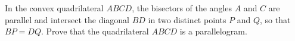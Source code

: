 \problem
In the convex quadrilateral $ABCD$, the bisectors of the angles $A$ and $C$ are parallel and intersect the diagonal $BD$ in two distinct points $P$ and $Q$, so that $BP = DQ$. 
Prove that the quadrilateral $ABCD$ is a parallelogram.
\solution
\endproblem
